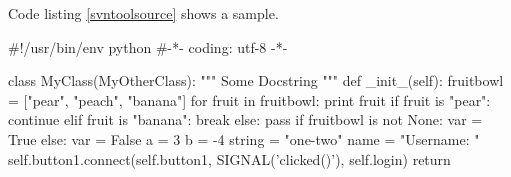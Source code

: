 \documentclass[11pt]{report}
\begin{document}
 

\lstlistoflistings 
\clearpage 

Code listing \ref{svntoolsource} shows a sample. 

\begin{python}[caption={SvnTool source code},label=svntoolsource] 
#!/usr/bin/env python 
#-*- coding: utf-8 -*- 

class MyClass(MyOtherClass): 
""" 
Some Docstring 
""" 
def _init_(self): 
fruitbowl = ["pear", "peach", "banana"] 
for fruit in fruitbowl: 
print fruit 
if fruit is "pear": 
continue 
elif fruit is "banana": 
break 
else: 
pass 
if fruitbowl is not None: 
var = True 
else: 
var = False 
a = 3 
b = -4 
string = "one-two" 
name = "Username: " 
self.button1.connect(self.button1, 
SIGNAL('clicked()'), 
self.login) 
return 
\end{python} 
\end{document}
